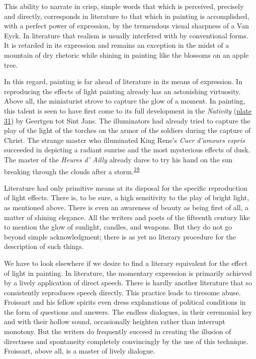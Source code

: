 This ability to narrate in crisp, simple words that which is perceived,
precisely and directly, corresponds in literature to that which in
painting is accomplished, with a perfect power of
expres\protect\hypertarget{21_Chapter_Thirteen__IMAGE_AND_WORD.xhtmlux5cux23page_347}{}{}sion,
by the tremendous visual sharpness of a Van Eyck. In literature that
realism is usually interfered with by conventional forms. It is retarded
in its expression and remains an exception in the midst of a mountain of
dry rhetoric while shining in painting like the blossoms on an apple
tree.

In this regard, painting is far ahead of literature in its means of
expression. In reproducing the effects of light painting already has an
astonishing virtuosity. Above all, the miniaturist strove to capture the
glow of a moment. In painting, this talent is seen to have first come to
its full development in the \emph{Nativity}
(\protect\hyperlink{20_ILLUSTRATIONS_FOLLOW_PAGE.xhtmlux5cux23id_28}{plate
31}) by Geertgen tot Sint Jans. The illuminators had already tried to
capture the play of the light of the torches on the armor of the
soldiers during the capture of Christ. The strange master who
illuminated King Rene's \emph{Cuer d'amours espris} succeeded in
depicting a radiant sunrise and the most mysterious effects of dusk. The
master of the \emph{Heures d' Ailly} already dares to try his hand on
the sun breaking through the clouds after a
storm.\textsuperscript{\protect\hypertarget{21_Chapter_Thirteen__IMAGE_AND_WORD.xhtmlux5cux23id_272}{\protect\hyperlink{23_NOTES.xhtmlux5cux23id_273}{19}}}

Literature had only primitive means at its disposal for the specific
reproduction of light effects. There is, to be sure, a high sensitivity
to the play of bright light, as mentioned above. There is even an
awareness of beauty as being first of all, a matter of shining elegance.
All the writers and poets of the fifteenth century like to mention the
glow of sunlight, candles, and weapons. But they do not go beyond simple
acknowledgment; there is as yet no literary procedure for the
description of such things.

We have to look elsewhere if we desire to find a literary equivalent for
the effect of light in painting. In literature, the momentary expression
is primarily achieved by a lively application of direct speech. There is
hardly another literature that so consistently reproduces speech
directly. This practice leads to tiresome abuse. Froissart and his
fellow spirits even dress explanations of political conditions in the
form of questions and answers. The endless dialogues, in their
ceremonial key and with their hollow sound, occasionally heighten rather
than interrupt monotony. But the writers do frequently succeed in
creating the illusion of directness and spontaneity completely
convincingly by the use of this technique. Froissart, above all, is a
master of lively dialogue.

